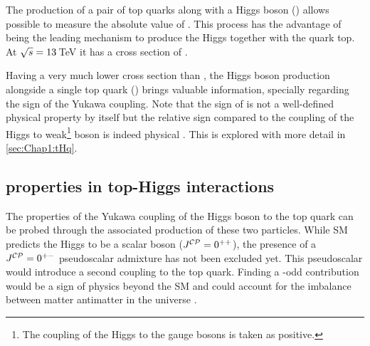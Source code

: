 The production of a pair of top quarks along with a Higgs boson (\ttH) allows possible 
to measure the absolute value of \yt. This process has the advantage of 
being the leading mechanism to produce the Higgs together with the quark 
top. At $\sqrt{s}=13\,$TeV it has a cross section of .

Having a very much lower cross section than \ttH {}, 
the Higgs boson production alongside a single top quark (\tH) brings valuable information, specially
regarding the sign of the Yukawa coupling. Note that the sign of \yt is not a well-defined physical 
property by itself but the relative sign compared to the coupling of the Higgs to 
weak\footnote{The coupling of the Higgs to the gauge bosons is taken as positive.} boson is indeed physical \cite{Farina:2012xp}. 
This is explored with more detail in \ref{sec:Chap1:tHq}. 







\subsection{\CP properties in top-Higgs interactions}
The \CP properties of the Yukawa coupling of the Higgs boson to the
top quark can be probed through the associated production of these 
two particles. While SM predicts the Higgs to be a scalar boson ($J^{\mathcal{CP}}=0^{++}$),
the presence of a $J^{\mathcal{CP}}=0^{+-}$ pseudoscalar admixture has not 
been excluded yet. This pseudoscalar would introduce a second coupling
to the top quark. Finding a \CP-odd contribution would be a sign of physics
beyond the SM and could account for the imbalance between matter
antimatter in the universe \cite{ATLAS:2020ior}. 

